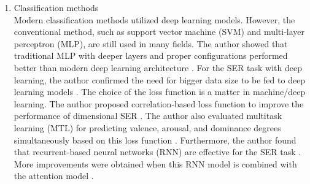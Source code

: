 \begin{enumerate}
\item Classification methods \\ 
Modern classification methods utilized deep learning models. However, the
conventional method, such as support vector machine (SVM) and multi-layer
perceptron (MLP), are still used in many fields. The author showed that
traditional MLP with deeper layers and proper configurations performed better
than modern deep learning architecture \cite{Atmaja2020k}. For the SER task
with deep learning, the author confirmed the need for bigger data size to be fed
to deep learning models \cite{Atmaja2019c}. The choice of the loss function is
a matter in machine/deep learning. The author proposed correlation-based loss
function to improve the performance of dimensional SER \cite{Atmaja2020,
Atmaja2020d,Atmaja2020b}. The author also evaluated multitask learning (MTL)
for predicting valence, arousal, and dominance degrees simultaneously based on
this loss function \cite{Atmaja2020d, Atmaja2020i}.  Furthermore, the author
found that recurrent-based neural networks (RNN) are effective for the SER task
\cite{Atmaja2019a}. More improvements were obtained when this RNN model is
combined with the attention model \cite{Atmaja2019}.
\end{enumerate}


